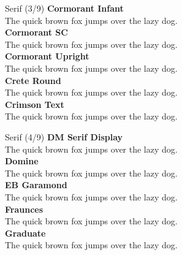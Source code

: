 \documentclass[10pt]{beamer}
\begin{document}
\begin{frame}{Serif (3/9)}
\vspace{-0.2cm}
  {\CormorantInfantLocal\Large\bfseries Cormorant Infant\\}
  {\CormorantInfantLocal The quick brown fox jumps over the lazy dog.\\[0.3cm]}
  {\CormorantSCLocal\Large\bfseries Cormorant SC\\}
  {\CormorantSCLocal The quick brown fox jumps over the lazy dog.\\[0.3cm]}
  {\CormorantUprightLocal\Large\bfseries Cormorant Upright\\}
  {\CormorantUprightLocal The quick brown fox jumps over the lazy dog.\\[0.3cm]}
  {\CreteRoundLocal\Large\bfseries Crete Round\\}
  {\CreteRoundLocal The quick brown fox jumps over the lazy dog.\\[0.3cm]}
  {\CrimsonTextLocal\Large\bfseries Crimson Text\\}
  {\CrimsonTextLocal The quick brown fox jumps over the lazy dog.\\[0.3cm]}
\end{frame}

\begin{frame}{Serif (4/9)}
\vspace{-0.2cm}
  {\DMSerifDisplayLocal\Large\bfseries DM Serif Display\\}
  {\DMSerifDisplayLocal The quick brown fox jumps over the lazy dog.\\[0.3cm]}
  {\DomineLocal\Large\bfseries Domine\\}
  {\DomineLocal The quick brown fox jumps over the lazy dog.\\[0.3cm]}
  {\EBGaramondLocal\Large\bfseries EB Garamond\\}
  {\EBGaramondLocal The quick brown fox jumps over the lazy dog.\\[0.3cm]}
  {\FrauncesLocal\Large\bfseries Fraunces\\}
  {\FrauncesLocal The quick brown fox jumps over the lazy dog.\\[0.3cm]}
  {\GraduateLocal\Large\bfseries Graduate\\}
  {\GraduateLocal The quick brown fox jumps over the lazy dog.\\[0.3cm]}
\end{frame}
\end{document}
